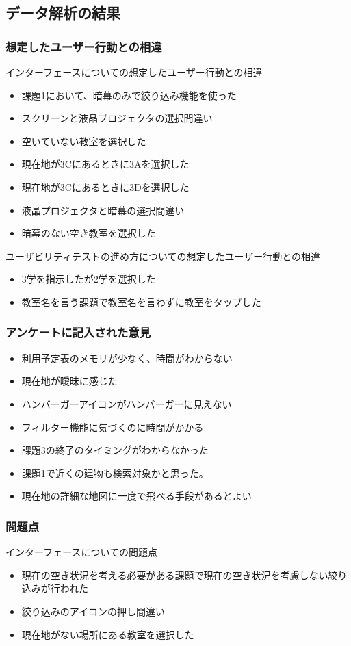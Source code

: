 \documentclass[12pt,a4paper,dvipdf]{jsarticle}
\begin{document}
\subsection{データ解析の結果}
\subsubsection{想定したユーザー行動との相違}
インターフェースについての想定したユーザー行動との相違
\begin{itemize}
    \item 課題1において、暗幕のみで絞り込み機能を使った
    \item スクリーンと液晶プロジェクタの選択間違い
    \item 空いていない教室を選択した
    \item 現在地が3Cにあるときに3Aを選択した
    \item 現在地が3Cにあるときに3Dを選択した
    \item 液晶プロジェクタと暗幕の選択間違い
    \item 暗幕のない空き教室を選択した
\end{itemize}
ユーザビリティテストの進め方についての想定したユーザー行動との相違
\begin{itemize}
    \item 3学を指示したが2学を選択した
    \item 教室名を言う課題で教室名を言わずに教室をタップした
\end{itemize}

\subsubsection{アンケートに記入された意見}
\begin{itemize}
    \item 利用予定表のメモリが少なく、時間がわからない
    \item 現在地が曖昧に感じた
    \item ハンバーガーアイコンがハンバーガーに見えない
    \item フィルター機能に気づくのに時間がかかる
    \item 課題3の終了のタイミングがわからなかった
    \item 課題1で近くの建物も検索対象かと思った。
    \item 現在地の詳細な地図に一度で飛べる手段があるとよい
\end{itemize}
\subsubsection{問題点}
インターフェースについての問題点
\begin{itemize}
    \item 現在の空き状況を考える必要がある課題で現在の空き状況を考慮しない絞り込みが行われた
    \item 絞り込みのアイコンの押し間違い
    \item 現在地がない場所にある教室を選択した
\end{itemize}
\end{document}
